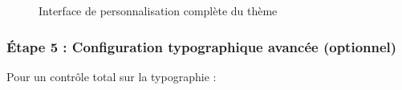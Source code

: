 \begin{figure}[h]
    \centering
    \caption{Interface de personnalisation complète du thème}
\end{figure}

\subsubsection{Étape 5 : Configuration typographique avancée (optionnel)}

Pour un contrôle total sur la typographie :

